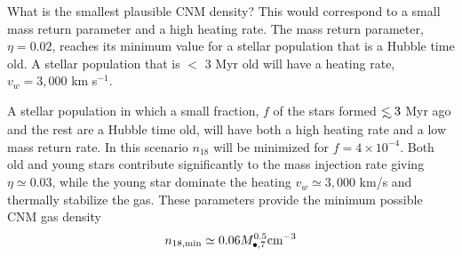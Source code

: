 \documentclass[usenatbib,fleqn]{mnras}
\newcommand\lsim{\mathrel{\rlap{\lower4pt\hbox{\hskip1pt$\sim$}}
    \raise1pt\hbox{$<$}}}
\newcommand{\Mbh}[1][]{M_{\bullet#1}}
\begin{document}

What is the smallest plausible CNM density? This would correspond to a
small mass return parameter and a high heating rate. The mass return
parameter, $\eta=0.02$, reaches its minimum value for a stellar
population that is a Hubble time old. A stellar population
that is $<$ 3 Myr old will have a heating rate, $v_w=3,000$ km s$^{-1}$.

A stellar population in which a small fraction, $f$ of the stars
formed $\lsim 3$ Myr ago and the rest are a Hubble time old, will have
both a high heating rate and a low mass return rate. In this scenario
$n_{18}$ will be minimized for $f=4\times 10^{-4}$. Both old and young
stars contribute significantly to the mass injection rate giving
$\eta\simeq 0.03$, while the young star dominate the heating
$v_w\simeq 3,000$ km/s and thermally stabilize the gas. These
parameters provide the minimum possible CNM gas density
\begin{equation}
n_{\rm 18,min}\simeq 0.06 \Mbh[,7]^{0.5} {\rm cm^{-3}}
\label{eq:n18min}
\end{equation}
\end{document}
